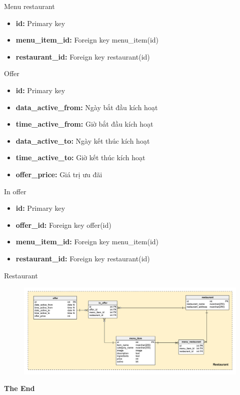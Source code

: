 \documentclass[aspectratio=43,xcolor=dvipsnames]{beamer}
\begin{document}
	\begin{frame}{Menu restaurant}
		\begin{itemize}
			\item \textbf{id:} Primary key
			\item \textbf{menu\_item\_id: } Foreign key menu\_item(id)
			\item \textbf{restaurant\_id: } Foreign key restaurant(id)
		\end{itemize}
	\end{frame}
	
	\begin{frame}{Offer}
		\begin{itemize}
			\item \textbf{id:} Primary key
			\item \textbf{data\_active\_from:} Ngày bắt đầu kích hoạt
			\item \textbf{time\_active\_from:} Giờ bắt đầu kích hoạt
			\item \textbf{data\_active\_to:} Ngày kết thúc kích hoạt
			\item \textbf{time\_active\_to:} Giờ kết thúc kích hoạt
			\item \textbf{offer\_price:} Giá trị ưu đãi
		\end{itemize}
	\end{frame}
	\begin{frame}{In offer}
		\begin{itemize}
			\item \textbf{id:} Primary key
			\item \textbf{offer\_id: } Foreign key offer(id)
			\item \textbf{menu\_item\_id: } Foreign key menu\_item(id)
			\item \textbf{restaurant\_id: } Foreign key restaurant(id)
		\end{itemize}
	\end{frame}
	
	\begin{frame}{Restaurant}
		\begin{figure}[ht!]
			\centerline{\includegraphics[width=1\textwidth]{restaurant.png}}
			\label{fig:ass1}
		\end{figure}
	\end{frame}
	\begin{frame}
		\Huge{\centerline{\textbf{The End}}}
	\end{frame}
	
	
\end{document}
